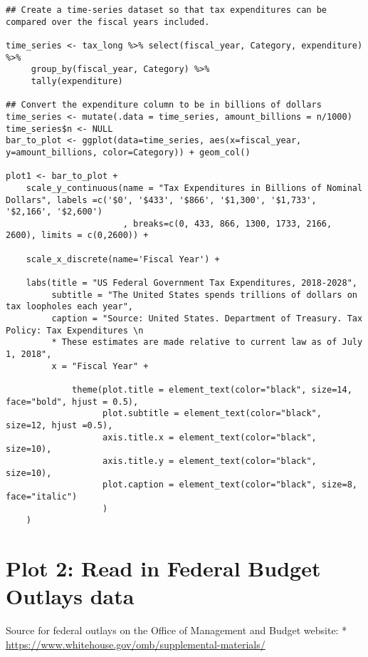\documentclass[]{article}
\begin{document}
\begin{verbatim}
## Create a time-series dataset so that tax expenditures can be compared over the fiscal years included.  

time_series <- tax_long %>% select(fiscal_year, Category, expenditure) %>%
     group_by(fiscal_year, Category) %>%
     tally(expenditure)

## Convert the expenditure column to be in billions of dollars
time_series <- mutate(.data = time_series, amount_billions = n/1000)
time_series$n <- NULL
bar_to_plot <- ggplot(data=time_series, aes(x=fiscal_year, y=amount_billions, color=Category)) + geom_col()

plot1 <- bar_to_plot + 
    scale_y_continuous(name = "Tax Expenditures in Billions of Nominal Dollars", labels =c('$0', '$433', '$866', '$1,300', '$1,733', '$2,166', '$2,600') 
                       , breaks=c(0, 433, 866, 1300, 1733, 2166, 2600), limits = c(0,2600)) + 
    
    scale_x_discrete(name='Fiscal Year') + 
    
    labs(title = "US Federal Government Tax Expenditures, 2018-2028", 
         subtitle = "The United States spends trillions of dollars on tax loopholes each year",
         caption = "Source: United States. Department of Treasury. Tax Policy: Tax Expenditures \n 
         * These estimates are made relative to current law as of July 1, 2018", 
         x = "Fiscal Year" + 
             
             theme(plot.title = element_text(color="black", size=14, face="bold", hjust = 0.5),
                   plot.subtitle = element_text(color="black", size=12, hjust =0.5),
                   axis.title.x = element_text(color="black", size=10),
                   axis.title.y = element_text(color="black", size=10),
                   plot.caption = element_text(color="black", size=8, face="italic")
                   )
    )
\end{verbatim}

\n\n\n

\hypertarget{plot-2-read-in-federal-budget-outlays-data}{%
\section{Plot 2: Read in Federal Budget Outlays
data}\label{plot-2-read-in-federal-budget-outlays-data}}

Source for federal outlays on the Office of Management and Budget
website: * \url{https://www.whitehouse.gov/omb/supplemental-materials/}
\end{document}
